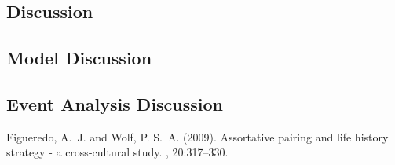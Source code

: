\documentclass[twoside]{article}
\begin{document}
\begin{multicols}{2}
\section{Discussion}

\subsection{Model Discussion}

\lipsum[7] %

\subsection{Event Analysis Discussion}

\lipsum[8] %


\begin{thebibliography}{99} %

Figueredo, A.~J. and Wolf, P. S.~A. (2009).
\newblock Assortative pairing and life history strategy - a cross-cultural
  study.
, 20:317--330.
 
\end{thebibliography}


\end{multicols}
\end{document}
